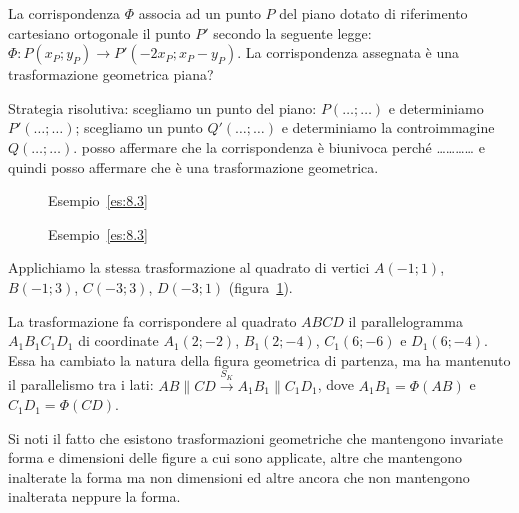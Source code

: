\begin{exrig}
\begin{esempio}\label{es:8.3}
La corrispondenza $\Phi$ associa ad un punto $P$ del piano dotato di 
riferimento cartesiano ortogonale il punto $P'$ secondo la seguente 
legge:
$\Phi : P(x_P;y_P) \rightarrow P'(-2x_P;x_P-y_P)$. La corrispondenza 
assegnata è una trasformazione geometrica piana?\vspace{7pt}

Strategia risolutiva: 
scegliamo un punto del piano: $P(\ldots{};\ldots{})$ e determiniamo 
$P'(\ldots{};\ldots{})$;
scegliamo un punto $Q'(\ldots{};\ldots{})$ e determiniamo la 
controimmagine $Q(\ldots{};\ldots{})$.
posso affermare che la corrispondenza è biunivoca perché 
\ldots\ldots\ldots\ldots{} e quindi posso affermare che è una 
trasformazione geometrica.


\begin{inaccessibleblock}
 \begin{figure}[!htb]
\begin{center}
 \noindent\begin{minipage}{0.49\textwidth}
    \centering
	\caption{Esempio~\ref{es:8.3}}\label{fig:es8.3a}
 \end{minipage}
 \noindent\begin{minipage}{0.49\textwidth}
    \centering
    \caption{Esempio~\ref{es:8.3}}\label{fig:es8.3b}
 \end{minipage}
\end{center}
\end{figure}
\end{inaccessibleblock}


Applichiamo la stessa trasformazione al quadrato di vertici 
$A(-1;1)$, $B(-1;3)$, $C(-3;3)$, $D(-3;1)$ (figura~\ref{fig:es8.3b}).

La trasformazione fa corrispondere al quadrato $ABCD$ il 
parallelogramma $A_1B_1C_1D_1$ di coordinate $A_1(2;-2)$, 
$B_1(2;-4)$, $C_1(6;-6)$ e $D_1(6;-4)$. Essa ha cambiato la natura 
della figura geometrica di partenza, ma ha mantenuto il parallelismo 
tra i lati: $AB\parallel CD \overset{S_K}{\rightarrow} A_1B_1\parallel 
C_1D_1$, dove $A_1B_1=\Phi(AB)$ e $C_1D_1=\Phi(CD)$.
\end{esempio}
\end{exrig}

Si noti il fatto che esistono trasformazioni geometriche che 
mantengono invariate forma e dimensioni delle figure a cui sono 
applicate, altre che mantengono inalterate la forma ma non dimensioni 
ed altre ancora che non mantengono inalterata neppure la forma.


